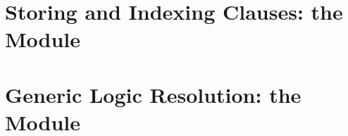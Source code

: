 \documentclass[presentation]{beamer}
\begin{document}
\section{Storing and Indexing Clauses: the  Module}

\section{Generic Logic Resolution: the  Module}

\section*{}
\frame{\titlepage}

\section*{\bibname}


\begin{frame}\frametitle{\refname}
	\footnotesize
    
	
\end{frame}

\end{document}
